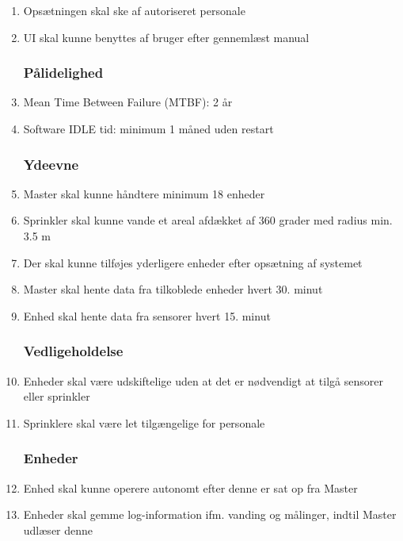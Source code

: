 \begin{enumerate}

\subsubsection*{Brugbarhed}
\item Opsætningen skal ske af autoriseret personale
\item UI skal kunne benyttes af bruger efter gennemlæst manual


\subsubsection*{Pålidelighed}
\item Mean Time Between Failure (MTBF): 2 år
\item Software IDLE tid: minimum 1 måned uden restart


\subsubsection*{Ydeevne}
\item Master skal kunne håndtere minimum 18 enheder
\item Sprinkler skal kunne vande et areal afdækket af 360 grader med radius min. 3.5 m 
\item Der skal kunne tilføjes yderligere enheder efter opsætning af systemet
\item Master skal hente data fra tilkoblede enheder hvert 30. minut
\item Enhed skal hente data fra sensorer hvert 15. minut


\subsubsection*{Vedligeholdelse}
\item Enheder skal være udskiftelige uden at det er nødvendigt at tilgå sensorer eller sprinkler
\item Sprinklere skal være let tilgængelige for personale


\subsubsection*{Enheder}
\item Enhed skal kunne operere autonomt efter denne er sat op fra Master
\item Enheder skal gemme log-information ifm. vanding og målinger, indtil Master udlæser denne

\end{enumerate}

